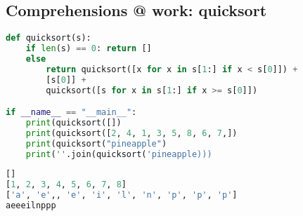 \subsection{Comprehensions @ work: quicksort}
\begin{lstlisting}[language=Python]
def quicksort(s):
	if len(s) == 0: return []
	else
		return quicksort([x for x in s[1:] if x < s[0]]) + 
		[s[0]] + 
		quicksort([s for x in s[1:] if x >= s[0]])

if __name__ == "__main__":
	print(quicksort([])
	print(quicksort([2, 4, 1, 3, 5, 8, 6, 7,])
	print(quicksort("pineapple")
	print(''.join(quicksort('pineapple)))
\end{lstlisting}

\begin{lstlisting}[language=Python]
[]
[1, 2, 3, 4, 5, 6, 7, 8]
['a', 'e',, 'e', 'i', 'l', 'n', 'p', 'p', 'p']
aeeeilnppp
\end{lstlisting}



